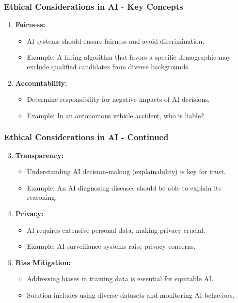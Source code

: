 \documentclass[aspectratio=169]{beamer}
\begin{document}
\begin{frame}[fragile]
  \frametitle{Ethical Considerations in AI - Key Concepts}
  \begin{enumerate}
    \item \textbf{Fairness:}
      \begin{itemize}
        \item AI systems should ensure fairness and avoid discrimination.
        \item Example: A hiring algorithm that favors a specific demographic may exclude qualified candidates from diverse backgrounds.
      \end{itemize}
      
    \item \textbf{Accountability:}
      \begin{itemize}
        \item Determine responsibility for negative impacts of AI decisions.
        \item Example: In an autonomous vehicle accident, who is liable?
      \end{itemize}
  \end{enumerate}
\end{frame}

\begin{frame}[fragile]
  \frametitle{Ethical Considerations in AI - Continued}
  \begin{enumerate}
    \setcounter{enumi}{2}
    \item \textbf{Transparency:}
      \begin{itemize}
        \item Understanding AI decision-making (explainability) is key for trust.
        \item Example: An AI diagnosing diseases should be able to explain its reasoning.
      \end{itemize}
    
    \item \textbf{Privacy:}
      \begin{itemize}
        \item AI requires extensive personal data, making privacy crucial.
        \item Example: AI surveillance systems raise privacy concerns.
      \end{itemize}
    
    \item \textbf{Bias Mitigation:}
      \begin{itemize}
        \item Addressing biases in training data is essential for equitable AI.
        \item Solution includes using diverse datasets and monitoring AI behaviors.
      \end{itemize}
  \end{enumerate}
\end{frame}
\end{document}
